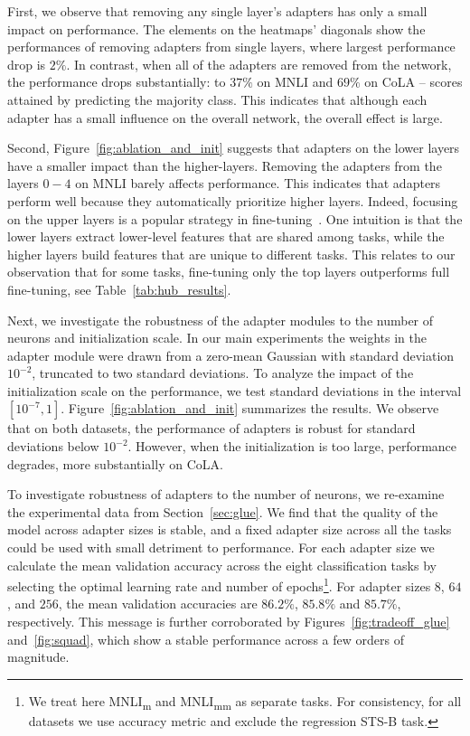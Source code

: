 First, we observe that removing any single layer's adapters has only a small impact on performance. The elements on the heatmaps' diagonals show the performances of removing adapters from single layers, where largest performance drop is $2\%$.
In contrast, when all of the adapters are removed from the network, the performance drops substantially: to $37\%$ on MNLI and $69\%$ on CoLA -- scores attained by predicting the majority class. This indicates that although each adapter has a small influence on the overall network, the overall effect is large.

Second, Figure~\ref{fig:ablation_and_init} suggests that adapters on the lower layers have a smaller impact than the higher-layers. Removing the adapters from the layers $0-4$ on MNLI barely affects performance. This indicates that adapters perform well because they automatically prioritize higher layers. Indeed, focusing on the upper layers is a popular strategy in fine-tuning~\citep{howard2018universal}. One intuition is that the lower layers extract lower-level features that are shared among tasks, while the higher layers build features that are unique to different tasks. This relates to our observation that for some tasks, fine-tuning only the top layers outperforms full fine-tuning, see Table~\ref{tab:hub_results}.

Next, we investigate the robustness of the adapter modules to the number of neurons and initialization scale. In our main experiments the weights in the adapter module were drawn from a zero-mean Gaussian with standard deviation $10^{-2}$, truncated to two standard deviations. To analyze the impact of the initialization scale on the performance, we test standard deviations in the interval $[10^{-7},1]$.
Figure~\ref{fig:ablation_and_init} summarizes the results. We observe that on both datasets, the performance of adapters is robust for standard deviations below $10^{-2}$. However, when the initialization is too large, performance degrades, more substantially on CoLA.

To investigate robustness of adapters to the number of neurons, we re-examine the experimental data from Section~\ref{sec:glue}.
We find that the quality of the model across adapter sizes is stable, and a fixed adapter size across all the tasks could be used with small detriment to performance. For each adapter size we calculate the mean validation accuracy across the eight classification tasks by selecting the optimal learning rate and number of epochs\footnote{
We treat here MNLI\textsubscript{m} and MNLI\textsubscript{mm} as separate tasks. For consistency, for all datasets we use accuracy metric and exclude the regression STS-B task.}. For adapter sizes $8$, $64$, and $256$, the mean validation accuracies are $86.2\%$, $85.8\%$ and $85.7\%$, respectively. This message is further corroborated by Figures~\ref{fig:tradeoff_glue} and~\ref{fig:squad},
which show a stable performance across a few orders of magnitude.

